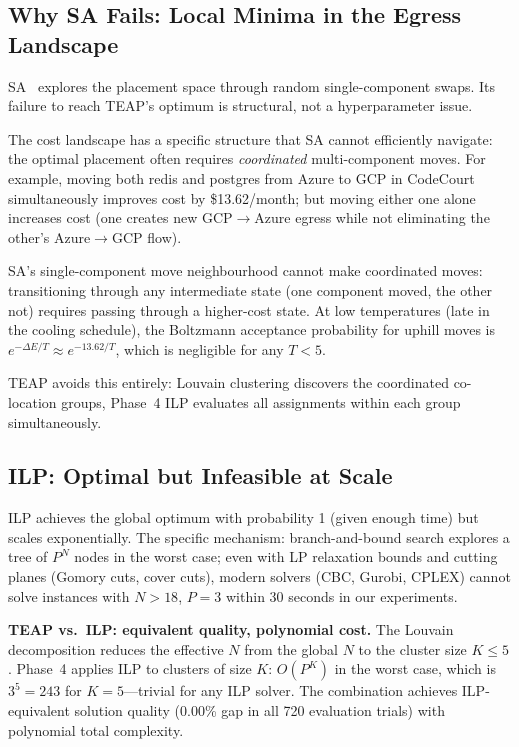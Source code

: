 \documentclass[10pt,journal]{IEEEtran}
\begin{document}
\subsection{Why SA Fails: Local Minima in the Egress Landscape}

SA~\cite{kirkpatrick1983} explores the placement space through random single-component
swaps.
Its failure to reach TEAP's optimum is structural, not a hyperparameter issue.

The cost landscape has a specific structure that SA cannot efficiently navigate:
the optimal placement often requires \emph{coordinated} multi-component moves.
For example, moving both redis and postgres from Azure to GCP in CodeCourt
simultaneously improves cost by \$13.62/month; but moving either one alone
increases cost (one creates new GCP$\to$Azure egress while not eliminating the
other's Azure$\to$GCP flow).

SA's single-component move neighbourhood cannot make coordinated moves:
transitioning through any intermediate state (one component moved, the other not)
requires passing through a higher-cost state.
At low temperatures (late in the cooling schedule), the Boltzmann acceptance
probability for uphill moves is $e^{-\Delta E / T} \approx e^{-13.62/T}$,
which is negligible for any $T < 5$.

TEAP avoids this entirely: Louvain clustering discovers the coordinated
co-location groups, Phase~4 ILP evaluates all assignments within each group
simultaneously.

\subsection{ILP: Optimal but Infeasible at Scale}

ILP achieves the global optimum with probability 1 (given enough time)
but scales exponentially.
The specific mechanism: branch-and-bound search explores a tree of $P^N$ nodes
in the worst case; even with LP relaxation bounds and cutting planes (Gomory cuts,
cover cuts), modern solvers (CBC, Gurobi, CPLEX) cannot solve instances with
$N > 18$, $P = 3$ within 30 seconds in our experiments.

\textbf{TEAP vs.\ ILP: equivalent quality, polynomial cost.}
The Louvain decomposition reduces the effective $N$ from the global $N$ to the
cluster size $K \leq 5$.
Phase~4 applies ILP to clusters of size $K$: $O(P^K)$ in the worst case,
which is $3^5 = 243$ for $K=5$---trivial for any ILP solver.
The combination achieves ILP-equivalent solution quality (0.00\% gap in all
720 evaluation trials) with polynomial total complexity.
\end{document}

